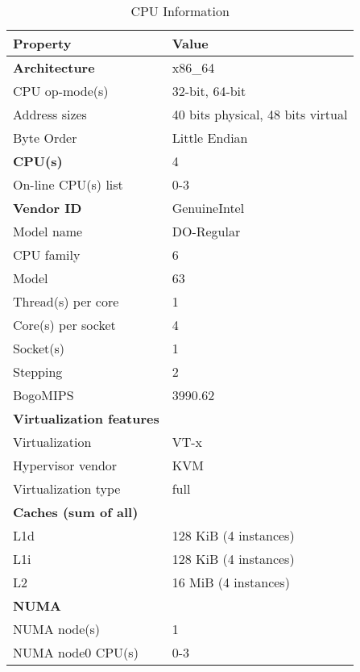 \documentclass{article}
\begin{document}
  \begin{table}[H]
    \centering
    \caption{CPU Information}
    \begin{tabular}{l l}
      \toprule
      \textbf{Property} & \textbf{Value} \\
      \midrule
      \textbf{Architecture} & x86\_64 \\
      CPU op-mode(s) & 32-bit, 64-bit \\
      Address sizes & 40 bits physical, 48 bits virtual \\
      Byte Order & Little Endian \\
      \midrule
      \textbf{CPU(s)} & 4 \\
      On-line CPU(s) list & 0-3 \\
      \textbf{Vendor ID} & GenuineIntel \\
      Model name & DO-Regular \\
      CPU family & 6 \\
      Model & 63 \\
      Thread(s) per core & 1 \\
      Core(s) per socket & 4 \\
      Socket(s) & 1 \\
      Stepping & 2 \\
      BogoMIPS & 3990.62 \\
      \midrule
      \textbf{Virtualization features} & \\
      Virtualization & VT-x \\
      Hypervisor vendor & KVM \\
      Virtualization type & full \\
      \midrule
      \textbf{Caches (sum of all)} & \\
      L1d & 128 KiB (4 instances) \\
      L1i & 128 KiB (4 instances) \\
      L2 & 16 MiB (4 instances) \\
      \midrule
      \textbf{NUMA} & \\
      NUMA node(s) & 1 \\
      NUMA node0 CPU(s) & 0-3 \\
      
      \bottomrule
    \end{tabular}
  \end{table}
\end{document}
